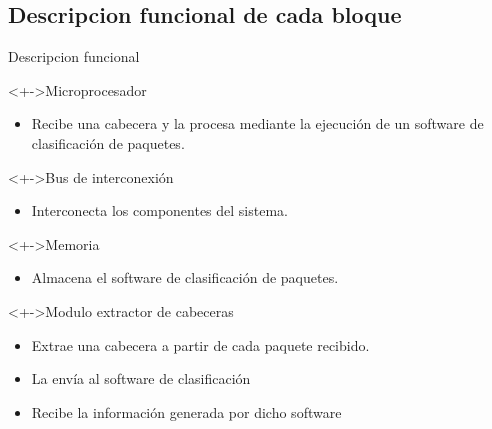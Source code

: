 \documentclass[xcolor=dvipsnames]{beamer}
\begin{document}
\subsection{Descripcion funcional de cada bloque}
\begin{frame}{Descripcion funcional}
\begin{block}<+->{Microprocesador}   
    \begin{itemize}
      \scriptsize
     	\item Recibe una cabecera y la procesa mediante la ejecución de un software de clasificación de paquetes.
    \end{itemize}
  \end{block}
  \begin{block}<+->{Bus de interconexión}   
    \begin{itemize}
      \scriptsize
     	\item Interconecta los componentes del sistema. 
    \end{itemize}
  \end{block}
\begin{block}<+->{Memoria}   
    \begin{itemize}
      \scriptsize
     	\item Almacena el software de clasificación de paquetes.
    \end{itemize}
  \end{block}
  \begin{block}<+->{Modulo extractor de cabeceras}   
    \begin{itemize}
      \scriptsize
     	\item Extrae una cabecera a partir de cada paquete recibido.
	\item La envía al software de clasificación
	\item Recibe la información generada por dicho software
    \end{itemize}
  \end{block}
\end{frame}
\end{document}

